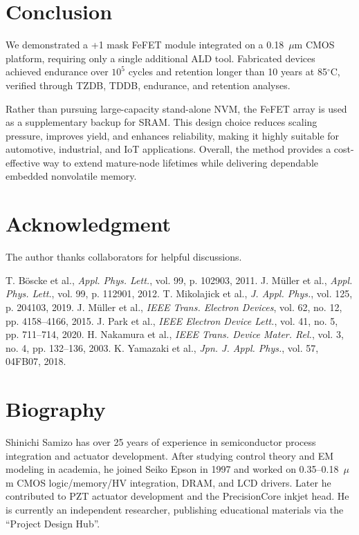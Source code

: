 \documentclass[conference]{IEEEtran}
\begin{document}
\section{Conclusion}
We demonstrated a +1 mask FeFET module integrated on a 0.18~$\mu$m CMOS platform, requiring only a single additional ALD tool. 
Fabricated devices achieved endurance over $10^5$ cycles and retention longer than 10 years at 85$^\circ$C, verified through TZDB, TDDB, endurance, and retention analyses. 

Rather than pursuing large-capacity stand-alone NVM, the FeFET array is used as a supplementary backup for SRAM. 
This design choice reduces scaling pressure, improves yield, and enhances reliability, making it highly suitable for automotive, industrial, and IoT applications. 
Overall, the method provides a cost-effective way to extend mature-node lifetimes while delivering dependable embedded nonvolatile memory.

\section*{Acknowledgment}
The author thanks collaborators for helpful discussions.

\begin{thebibliography}{1}\setlength{\itemsep}{0pt plus 0.3pt}
 T. Böscke et al., \textit{Appl. Phys. Lett.}, vol. 99, p. 102903, 2011.
 J. Müller et al., \textit{Appl. Phys. Lett.}, vol. 99, p. 112901, 2012.
 T. Mikolajick et al., \textit{J. Appl. Phys.}, vol. 125, p. 204103, 2019.
 J. Müller et al., \textit{IEEE Trans. Electron Devices}, vol. 62, no. 12, pp. 4158--4166, 2015.
 J. Park et al., \textit{IEEE Electron Device Lett.}, vol. 41, no. 5, pp. 711--714, 2020.
 H. Nakamura et al., \textit{IEEE Trans. Device Mater. Rel.}, vol. 3, no. 4, pp. 132--136, 2003.
 K. Yamazaki et al., \textit{Jpn. J. Appl. Phys.}, vol. 57, 04FB07, 2018.
\end{thebibliography}

\section*{Biography}
\small
Shinichi Samizo has over 25 years of experience in semiconductor process integration and actuator development. After studying control theory and EM modeling in academia, he joined Seiko Epson in 1997 and worked on 0.35--0.18~$\mu$m CMOS logic/memory/HV integration, DRAM, and LCD drivers. Later he contributed to PZT actuator development and the PrecisionCore inkjet head. He is currently an independent researcher, publishing educational materials via the ``Project Design Hub''.
\end{document}
